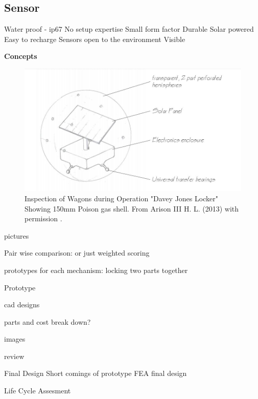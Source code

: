 \subsection{Sensor}


Water proof - ip67
No setup expertise
Small form factor
Durable
Solar powered
Easy to recharge
Sensors open to the environment
Visible

\textbf{Concepts}\\

\begin{figure}[H]
\centering
\includegraphics[width=0.8\linewidth]{Engineering_hardware/Engineering_hardware_Figures/Concept_ball.JPG}
\caption{Inspection of Wagons during Operation "Davey Jones Locker" Showing 150mm Poison gas shell. From Arison III H. L. (2013) with permission \cite{arison2014european}.  }
\label{fig:15cm_shell_loading}
\end{figure}


pictures

Pair wise comparison: or just weighted scoring




prototypes for each mechanism:
locking two parts together


Prototype

cad designs

parts and cost break down?

images

review


Final Design
Short comings of prototype FEA
final design


Life Cycle Assesment
